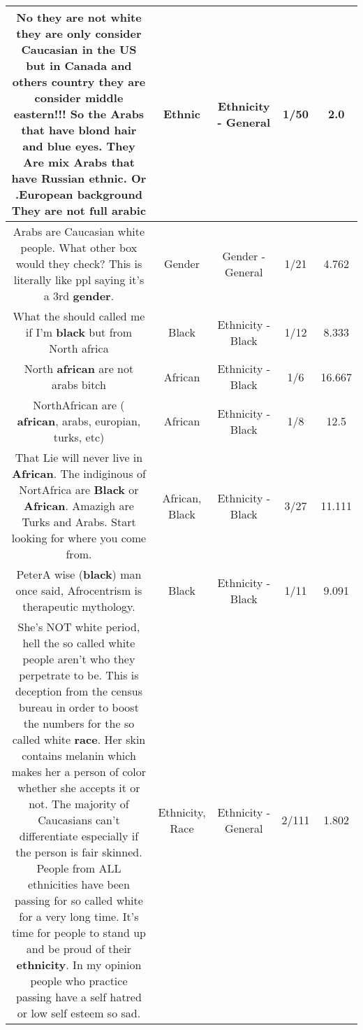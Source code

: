 \documentclass[11pt]{article}
\newlength\mylength
\begin{document}
\begin{center}
\begin{longtable}{|C{.65\mylength}|C{.30\mylength}|C{.12\mylength}|C{.12\mylength}|C{.12\mylength}|}
  \small No they are not white they are only consider Caucasian in the US but in Canada and others country  they are consider middle eastern!!! So the Arabs that have blond hair and blue eyes. They Are mix Arabs that have Russian \textbf{ethnic}. Or .European background They are not full arabic\normalsize   & Ethnic & Ethnicity - General & 1/50 & 2.0 \\  \hline
  \small Arabs are Caucasian white people. What other box would they check? This is literally like ppl saying it's a 3rd \textbf{gender}.\normalsize   & Gender & Gender - General & 1/21 & 4.762 \\  \hline
  \small What the should called me if I'm \textbf{black} but from North africa\normalsize   & Black & Ethnicity - Black & 1/12 & 8.333 \\  \hline
  \small North \textbf{african} are not arabs bitch\normalsize   & African & Ethnicity - Black & 1/6 & 16.667 \\  \hline
  \small NorthAfrican are ( \textbf{african}, arabs, europian, turks, etc)\normalsize   & African & Ethnicity - Black & 1/8 & 12.5 \\  \hline
  \small That Lie will never live in \textbf{African}.  The indiginous of NortAfrica are \textbf{Black} or \textbf{African}. Amazigh are Turks and Arabs. Start looking for where you come from.\normalsize   & African, Black & Ethnicity - Black & 3/27 & 11.111 \\  \hline
  \small PeterA wise (\textbf{black}) man once said, Afrocentrism is therapeutic mythology.\normalsize   & Black & Ethnicity - Black & 1/11 & 9.091 \\  \hline
  \small She's NOT white period, hell the so called white people aren't who they perpetrate to be. This is deception from the census bureau in order to boost the numbers for the so called white \textbf{race}. Her skin contains melanin which makes her a person of color whether she accepts it or not. The majority of Caucasians can't differentiate especially if the person is fair skinned. People from ALL ethnicities have been passing for so called white for a very long time. It's time for people to stand up and be proud of their \textbf{ethnicity}. In my opinion people who practice passing have a self hatred or low self esteem so sad.\normalsize   & Ethnicity, Race & Ethnicity - General & 2/111 & 1.802 \\  \hline

\end{longtable}
\end{center}
\end{document}
